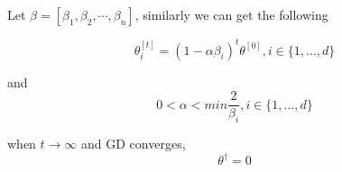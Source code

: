 \begin{answer}

Let $\beta = [\beta_1, \beta_2, \cdots, \beta_n]$, similarly we can get the following

\begin{equation*}
	 \theta^{[t]}_i = (1 - \alpha \beta_i) ^ t \theta ^{[0]}, i \in \{1,\dots,d\}
\end{equation*}

and 
\begin{equation*}
    0 < \alpha < min{\frac{2}{\beta_i}} , i \in \{1,\dots,d\}
\end{equation*}

when $t\to\infty$ and GD converges,
\begin{equation*}
    \theta ^ \dagger = 0
\end{equation*}


\end{answer}